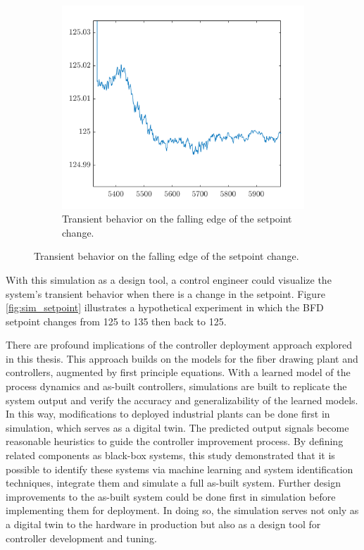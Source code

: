 \begin{figure}[ht!]
\begin{subfigure}[b]{0.48\textwidth}
        \includegraphics[width=\textwidth]{figures/setpoint_falling.png}
        \caption{Transient behavior on the falling edge of the setpoint change.}
    \end{subfigure}
\end{figure}

With this simulation as a design tool, a control engineer could visualize the system's transient behavior when there is a change in the setpoint. Figure \ref{fig:sim_setpoint} illustrates a hypothetical experiment in which the BFD setpoint changes from 125 to 135 then back to 125. 

There are profound implications of the controller deployment approach explored in this thesis. This approach builds on the models for the fiber drawing plant and controllers, augmented by first principle equations. With a learned model of the process dynamics and as-built controllers, simulations are built to replicate the system output and verify the accuracy and generalizability of the learned models. In this way, modifications to deployed industrial plants can be done first in simulation, which serves as a digital twin. The predicted output signals become reasonable heuristics to guide the controller improvement process. By defining related components as black-box systems, this study demonstrated that it is possible to identify these systems via machine learning and system identification techniques, integrate them and simulate a full as-built system. Further design improvements to the as-built system could be done first in simulation before implementing them for deployment. In doing so, the simulation serves not only as a digital twin to the hardware in production but also as a design tool for controller development and tuning.

